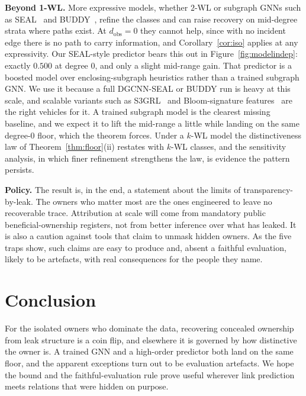 \documentclass[sigconf]{acmart}
\begin{document}
\textbf{Beyond 1-WL.} More expressive models, whether $2$-WL or subgraph GNNs
such as SEAL~\cite{seal} and BUDDY~\cite{buddy}, refine the classes and can raise
recovery on mid-degree strata where paths exist. At $d_{\mathrm{obs}}=0$ they
cannot help, since with no incident edge there is no path to carry information,
and Corollary~\ref{cor:iso} applies at any expressivity. Our SEAL-style predictor
bears this out in Figure~\ref{fig:modelindep}: exactly $0.500$ at degree $0$, and
only a slight mid-range gain. That predictor is a boosted model over
enclosing-subgraph heuristics rather than a trained subgraph GNN. We use it
because a full DGCNN-SEAL or BUDDY run is heavy at this scale, and scalable
variants such as S3GRL~\cite{s3grl} and Bloom-signature features~\cite{bloomsig}
are the right vehicles for it. A trained subgraph model is the clearest missing
baseline, and we expect it to lift the mid-range a little while landing on the
same degree-$0$ floor, which the theorem forces. Under a $k$-WL model the
distinctiveness law of Theorem~\ref{thm:floor}(ii) restates with $k$-WL classes,
and the sensitivity analysis, in which finer refinement strengthens the law, is
evidence the pattern persists.

\textbf{Policy.} The result is, in the end, a statement about the limits of
transparency-by-leak. The owners who matter most are the ones engineered to leave
no recoverable trace. Attribution at scale will come from mandatory public
beneficial-ownership registers, not from better inference over what has leaked. It
is also a caution against tools that claim to unmask hidden owners. As the five
traps show, such claims are easy to produce and, absent a faithful evaluation,
likely to be artefacts, with real consequences for the people they name.

\section{Conclusion}
For the isolated owners who dominate the data, recovering concealed ownership from
leak structure is a coin flip, and elsewhere it is governed by how distinctive the
owner is. A trained GNN and a high-order predictor both land on the same floor,
and the apparent exceptions turn out to be evaluation artefacts. We hope the bound
and the faithful-evaluation rule prove useful wherever link prediction meets
relations that were hidden on purpose.
\end{document}
